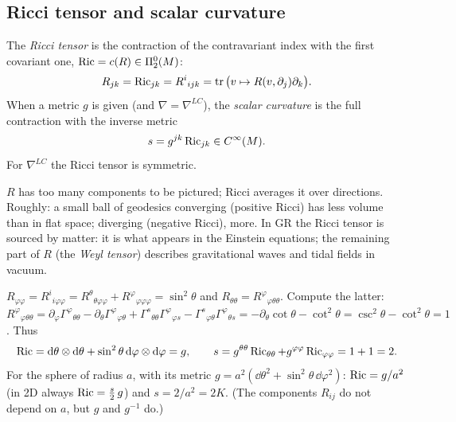 \subsection{Ricci tensor and scalar curvature}
\begin{formal}
The \emph{Ricci tensor} is the contraction of the contravariant index with the first covariant one, $\operatorname{Ric}=c(R)\in\Pi^{0}_{2}(M)$:
\[
R_{jk}=\operatorname{Ric}_{jk}=R^i{}_{ijk}=\operatorname{tr}\big(v\mapsto R(v,\partial_j)\partial_k\big).
\]
When a metric $g$ is given (and $\nabla=\nabla^{LC}$), the \emph{scalar curvature} is the full contraction with the inverse metric
\[
s=g^{jk}\operatorname{Ric}_{jk}\in C^\infty(M).
\]
For $\nabla^{LC}$ the Ricci tensor is symmetric.
\end{formal}
\begin{intuition}[{Ricci = ``how volumes of small balls differ from flat ones''}]
$R$ has too many components to be pictured; Ricci averages it over directions. Roughly: a small ball of geodesics converging (positive Ricci) has less volume than in flat space; diverging (negative Ricci), more. In GR the Ricci tensor is sourced by matter: it is what appears in the Einstein equations; the remaining part of $R$ (the \emph{Weyl tensor}) describes gravitational waves and tidal fields in vacuum.
\end{intuition}

\begin{example}
$R_{\varphi\varphi}=R^i{}_{i\varphi\varphi}=R^\theta{}_{\theta\varphi\varphi}+R^\varphi{}_{\varphi\varphi\varphi}=\sin^2\theta$ and $R_{\theta\theta}=R^\varphi{}_{\varphi\theta\theta}$. Compute the latter: $R^\varphi{}_{\varphi\theta\theta}=\partial_\varphi\Gamma^\varphi{}_{\theta\theta}-\partial_\theta\Gamma^\varphi{}_{\varphi\theta}+\Gamma^s{}_{\theta\theta}\Gamma^\varphi{}_{\varphi s}-\Gamma^s{}_{\varphi\theta}\Gamma^\varphi{}_{\theta s}=-\partial_\theta\cot\theta-\cot^2\theta=\csc^2\theta-\cot^2\theta=1$. Thus
\[
\operatorname{Ric}=\mathrm{d}\theta\otimes\mathrm{d}\theta+\sin^2\theta\,\mathrm{d}\varphi\otimes\mathrm{d}\varphi=g,\qquad s=g^{\theta\theta}\operatorname{Ric}_{\theta\theta}+g^{\varphi\varphi}\operatorname{Ric}_{\varphi\varphi}=1+1=2 .
\]
For the sphere of radius $a$, with its metric $g=a^2(\dd\theta^2+\sin^2\theta\,\dd\varphi^2)$: $\operatorname{Ric}=g/a^2$ (in 2D always $\operatorname{Ric}=\tfrac s2\,g$) and $s=2/a^2=2K$. (The components $R_{ij}$ do not depend on $a$, but $g$ and $g^{-1}$ do.)
\end{example}
